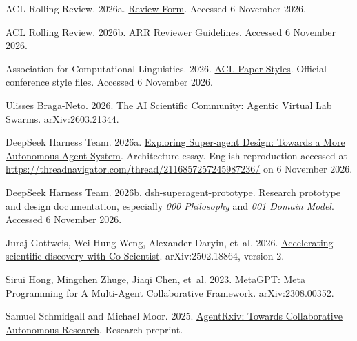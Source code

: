 \documentclass[11pt]{article}
\begin{document}
\begin{thebibliography}{}

ACL Rolling Review. 2026a.
\newblock \href{https://aclrollingreview.org/reviewform}{Review Form}.
\newblock Accessed 6 November 2026.

ACL Rolling Review. 2026b.
\newblock \href{https://aclrollingreview.org/reviewerguidelines}{ARR Reviewer Guidelines}.
\newblock Accessed 6 November 2026.

Association for Computational Linguistics. 2026.
\newblock \href{https://github.com/acl-org/acl-style-files}{ACL Paper Styles}.
\newblock Official conference style files. Accessed 6 November 2026.

Ulisses Braga-Neto. 2026.
\newblock \href{https://arxiv.org/abs/2603.21344}{The AI Scientific Community: Agentic Virtual Lab Swarms}.
\newblock arXiv:2603.21344.

DeepSeek Harness Team. 2026a.
\newblock \href{https://zhuanlan.zhihu.com/p/2099987320443237060}{Exploring Super-agent Design: Towards a More Autonomous Agent System}.
\newblock Architecture essay. English reproduction accessed at \url{https://threadnavigator.com/thread/2116857257245987236/} on 6 November 2026.

DeepSeek Harness Team. 2026b.
\newblock \href{https://github.com/deepseek-ai/dsh-superagent-prototype}{dsh-superagent-prototype}.
\newblock Research prototype and design documentation, especially \emph{000 Philosophy} and \emph{001 Domain Model}. Accessed 6 November 2026.

Juraj Gottweis, Wei-Hung Weng, Alexander Daryin, et~al. 2026.
\newblock \href{https://arxiv.org/abs/2502.18864v2}{Accelerating scientific discovery with Co-Scientist}.
\newblock arXiv:2502.18864, version 2.

Sirui Hong, Mingchen Zhuge, Jiaqi Chen, et~al. 2023.
\newblock \href{https://arxiv.org/abs/2308.00352}{MetaGPT: Meta Programming for A Multi-Agent Collaborative Framework}.
\newblock arXiv:2308.00352.

Samuel Schmidgall and Michael Moor. 2025.
\newblock \href{https://agentrxiv.github.io/resources/agentrxiv.pdf}{AgentRxiv: Towards Collaborative Autonomous Research}.
\newblock Research preprint.


\end{thebibliography}
\end{document}
